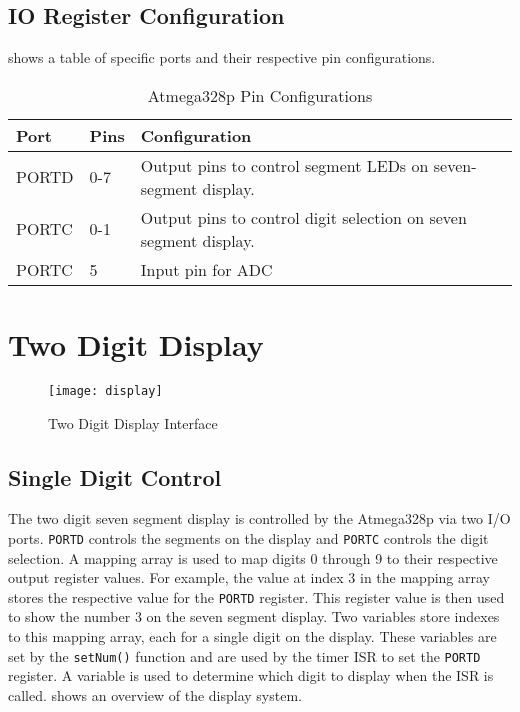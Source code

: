 \documentclass[main.tex]{subfiles}
\begin{document}
		\subsection{IO Register Configuration}
		 shows a table of specific ports and their
		respective pin configurations.

		\begin{table}[H]
			\begin{center}
				\begin{tabularx}{\textwidth}{llX} 
					Port & Pins & Configuration \\ \hline \hline
					PORTD & 0-7 & Output pins to control segment LEDs on seven-segment display. \\ \hline
					PORTC & 0-1 & Output pins to control digit selection on seven segment	display. \\ \hline
					PORTC & 5 & Input pin for ADC 
				\end{tabularx}
				\caption{Atmega328p Pin Configurations}
				\label{tab:pinConfig}
			\end{center}
		\end{table}
	
	\section{Two Digit Display}
		\begin{figure}[H]
			\begin{center}
				\texttt{[image: display]}
			\end{center}
			\caption{Two Digit Display Interface}
			\label{fig:twoDigitIfc}
		\end{figure}
		\subsection{Single Digit Control}

		The two digit seven segment display is controlled by the Atmega328p via two
		I/O ports. \lstinline{PORTD} controls the segments on the display and
		\lstinline{PORTC} controls the digit selection. A mapping array is used to
		map digits 0 through 9 to their respective output register values. For
		example, the value at index 3 in the mapping array stores the respective
		value for the \lstinline{PORTD} register. This register value is then used
		to show the number 3 on the seven segment display. Two variables store
		indexes to this mapping array, each for a single digit on the display. These
		variables are set by the \lstinline{setNum()} function and are used by the
		timer ISR to set the \lstinline{PORTD} register. A variable is used to
		determine which digit to display when the ISR is called.
		 shows an overview of the display system.
\end{document}
